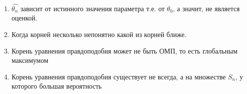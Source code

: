 \begin{note} ~
    \begin{enumerate}
        \item $\displaystyle \hat{\theta_n }$ зависит от истинного значения параметра т.е. от $\theta_0$, а значит, не является оценкой.

        \item Когда корней несколько непонятно какой из корней ближе.
        
        \item Корень уравнения правдоподобия может не быть ОМП, то есть глобальным максимумом
        
        \item Корень уравнения правдоподобия существует не всегда, а на множестве $S_n$, у которого большая вероятность
    \end{enumerate}

\end{note}



